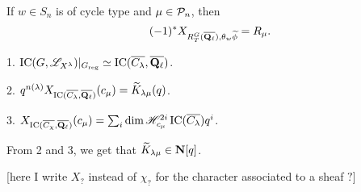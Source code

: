 \begin{theo}[Lusztig, 1998]
If $w\in S_n$ is of cycle type and $\mu\in \mathcal{P}_n$, then 
\[
  (-1)^\ast X_{R_T^G(\overline{\mathbf{Q}_\ell}), \theta_w\widetilde\phi} = R_\mu .
\]
\end{theo}

\begin{theo}[Lusztig, 1981]
1. $\operatorname{IC}(G, \mathscr{L}_{X^\lambda})|_{G_{\mathrm{reg}}} \simeq \operatorname{IC}(\overline{C_\lambda}, \overline{\mathbf{Q}_\ell})$. 

2. $q^{n(\lambda)} X_{\operatorname{IC}(\overline{C_\lambda}, \overline{\mathbf{Q}_\ell})}(c_\mu) = \widetilde K_{\lambda\mu}(q)$. 

3. $X_{\operatorname{IC}(\overline{C_\chi},\overline{\mathbf{Q}_\ell})}(c_\mu) = \sum_i \dim \mathscr{H}_{c_\mu}^{2 i} \operatorname{IC}(\overline{C_\lambda}) q^i$. 
\end{theo}

From 2 and 3, we get that $\widetilde K_{\lambda\mu}\in \mathbf{N}[q]$. 

[here I write $X_?$ instead of $\chi_?$ for the character associated to a sheaf 
$?$]

